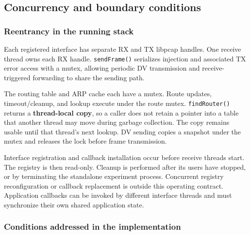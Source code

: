 \documentclass[
  a4paper,
  10pt]{article}
\begin{document}
\newpage

\subsection{Concurrency and boundary
conditions}\label{concurrency-and-boundary-conditions}

\subsubsection{Reentrancy in the running
stack}\label{reentrancy-in-the-running-stack}

Each registered interface has separate RX and TX libpcap handles. One
receive thread owns each RX handle. \texttt{sendFrame()} serializes
injection and associated TX error access with a mutex, allowing periodic
DV transmission and receive-triggered forwarding to share the sending
path.

The routing table and ARP cache each have a mutex. Route updates,
timeout/cleanup, and lookup execute under the route mutex.
\texttt{findRouter()} returns a \textbf{thread-local copy}, so a caller
does not retain a pointer into a table that another thread may move
during garbage collection. The copy remains usable until that thread's
next lookup. DV sending copies a snapshot under the mutex and releases
the lock before frame transmission.

Interface registration and callback installation occur before receive
threads start. The registry is then read-only. Cleanup is performed
after its users have stopped, or by terminating the standalone
experiment process. Concurrent registry reconfiguration or callback
replacement is outside this operating contract. Application callbacks
can be invoked by different interface threads and must synchronize their
own shared application state.

\subsubsection{Conditions addressed in the
implementation}\label{conditions-addressed-in-the-implementation}
\end{document}
